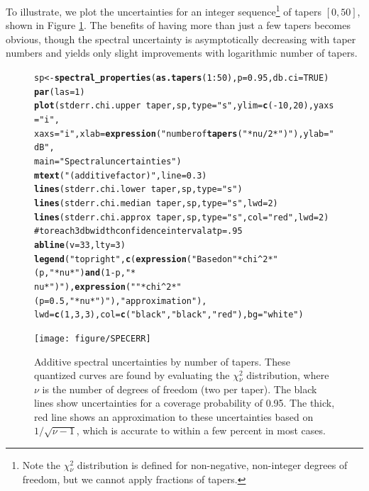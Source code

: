 \documentclass[10pt]{article}\usepackage{graphicx, color}
\makeatletter
\newcommand{\hlfunctioncall}[1]{\textcolor[rgb]{0.501960784313725,0,0.329411764705882}{\textbf{#1}}}%
\newcommand{\hlstring}[1]{\textcolor[rgb]{0.6,0.6,1}{#1}}%
\newcommand{\hlcomment}[1]{\textcolor[rgb]{0.180392156862745,0.6,0.341176470588235}{#1}}%
\newenvironment{kframe}{%
 \def\at@end@of@kframe{}%
 \ifinner\ifhmode%
  \def\at@end@of@kframe{\end{minipage}}%
  \begin{minipage}{\columnwidth}%
 \fi\fi%
 \def\FrameCommand##1{\hskip\@totalleftmargin \hskip-\fboxsep
 \colorbox{shadecolor}{##1}\hskip-\fboxsep
     \hskip-\linewidth \hskip-\@totalleftmargin \hskip\columnwidth}%
 \MakeFramed {\advance\hsize-\width
   \@totalleftmargin\z@ \linewidth\hsize
   \@setminipage}}%
 {\par\unskip\endMakeFramed%
 \at@end@of@kframe}
\newenvironment{knitrout}{}{} %
\makeatother
\begin{document}
To illustrate, we 
plot the uncertainties for an integer sequence\footnote{
Note the $\chi{}_{\nu}^2$ distribution is defined for non-negative,
non-integer degrees of freedom, but we cannot apply
fractions of tapers.} of tapers $[0, 50]$, shown in
Figure \ref{fig:psderr}.  The benefits of having more than just
a few tapers becomes obvious, though the spectral uncertainty
is asymptotically decreasing with taper numbers and yields
only slight improvements with logarithmic number of tapers.

\begin{figure}[htb!]
\begin{center}
\begin{knitrout}
\color{fgcolor}\begin{kframe}
\begin{alltt}
sp <- \hlfunctioncall{spectral_properties}(\hlfunctioncall{as.tapers}(1:50), p = 0.95, db.ci = TRUE)
\hlfunctioncall{par}(las = 1)
\hlfunctioncall{plot}(stderr.chi.upper ~ taper, sp, type = \hlstring{"s"}, ylim = \hlfunctioncall{c}(-10, 20), yaxs = \hlstring{"i"}, 
    xaxs = \hlstring{"i"}, xlab = \hlfunctioncall{expression}(\hlstring{"number of \hlfunctioncall{tapers} ("} * nu/2 * \hlstring{")"}), ylab = \hlstring{"dB"}, 
    main = \hlstring{"Spectral uncertainties"})
\hlfunctioncall{mtext}(\hlstring{"(additive factor)"}, line = 0.3)
\hlfunctioncall{lines}(stderr.chi.lower ~ taper, sp, type = \hlstring{"s"})
\hlfunctioncall{lines}(stderr.chi.median ~ taper, sp, type = \hlstring{"s"}, lwd = 2)
\hlfunctioncall{lines}(stderr.chi.approx ~ taper, sp, type = \hlstring{"s"}, col = \hlstring{"red"}, lwd = 2)
\hlcomment{# to reach 3 db width confidence interval at p=.95}
\hlfunctioncall{abline}(v = 33, lty = 3)
\hlfunctioncall{legend}(\hlstring{"topright"}, \hlfunctioncall{c}(\hlfunctioncall{expression}(\hlstring{"Based on "} * chi^2 * \hlstring{"(p,"} * nu * \hlstring{") \hlfunctioncall{and} (1-p,"} * 
    nu * \hlstring{")"}), \hlfunctioncall{expression}(\hlstring{""} * chi^2 * \hlstring{"(p=0.5,"} * nu * \hlstring{")"}), \hlstring{"approximation"}), 
    lwd = \hlfunctioncall{c}(1, 3, 3), col = \hlfunctioncall{c}(\hlstring{"black"}, \hlstring{"black"}, \hlstring{"red"}), bg = \hlstring{"white"})
\end{alltt}
\end{kframe}
\texttt{[image: figure/SPECERR]} 

\end{knitrout}

\caption{Additive spectral uncertainties by number of tapers.
These quantized curves are found
by evaluating the $\chi{}_{\nu}^2$ distribution, where $\nu$ is
the number of degrees of freedom (two per taper).  
The black lines show uncertainties for a coverage probability of 0.95.
The thick, red line shows an approximation to these uncertainties
based on $1/\sqrt{\nu-1}$, which is accurate to within a few percent in most cases.
}
\label{fig:psderr}
\end{center}
\end{figure}
\end{document}
